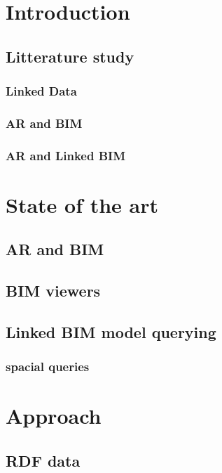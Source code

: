\documentclass[12pt,a4paper,faculty=ea,language=en,doctype=report]{ugent-doc}
\renewcommand{\ULthickness}{2pt} %
\begin{document}
\maketitle
\renewcommand{\ULthickness}{1pt}
{\hypersetup{hidelinks}\tableofcontents} %
\listoffigures
\newpage



% 

\chapter{Introduction}
  \section{Litterature study}
    \subsection{Linked Data}
    \subsection{AR and BIM}
    \subsection{AR and Linked BIM}
\chapter{State of the art}
  \section{AR and BIM}
  \section{BIM viewers}
  \section{Linked BIM model querying}
    \subsection{spacial queries}

\chapter{Approach}
  \section{RDF data}
\end{document}
